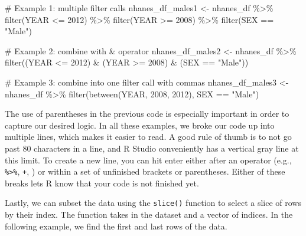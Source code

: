\documentclass[
  letterpaper,
]{latex/krantz}
\makeatletter
\newenvironment{Shaded}{\begin{snugshade}}{\end{snugshade}}
\newcommand{\CommentTok}[1]{\textcolor[rgb]{0.37,0.37,0.37}{#1}}
\newcommand{\DecValTok}[1]{\textcolor[rgb]{0.68,0.00,0.00}{#1}}
\newcommand{\FunctionTok}[1]{\textcolor[rgb]{0.28,0.35,0.67}{#1}}
\newcommand{\NormalTok}[1]{\textcolor[rgb]{0.00,0.23,0.31}{#1}}
\newcommand{\OtherTok}[1]{\textcolor[rgb]{0.00,0.23,0.31}{#1}}
\newcommand{\SpecialCharTok}[1]{\textcolor[rgb]{0.37,0.37,0.37}{#1}}
\newcommand{\StringTok}[1]{\textcolor[rgb]{0.13,0.47,0.30}{#1}}
\newenvironment{kframe}{%
\medskip{}
\setlength{\fboxsep}{.8em}
 \def\at@end@of@kframe{}%
 \ifinner\ifhmode%
  \def\at@end@of@kframe{\end{minipage}}%
  \begin{minipage}{\columnwidth}%
 \fi\fi%
 \def\FrameCommand##1{\hskip\@totalleftmargin \hskip-\fboxsep
 \colorbox{shadecolor}{##1}\hskip-\fboxsep
     \hskip-\linewidth \hskip-\@totalleftmargin \hskip\columnwidth}%
 \MakeFramed {\advance\hsize-\width
   \@totalleftmargin\z@ \linewidth\hsize
   \@setminipage}}%
 {\par\unskip\endMakeFramed%
 \at@end@of@kframe}
\renewenvironment{Shaded}{\begin{kframe}}{\end{kframe}}
\makeatother
\begin{document}
\begin{Shaded}
\begin{Highlighting}[]
\CommentTok{\# Example 1: multiple filter calls}
\NormalTok{nhanes\_df\_males1 }\OtherTok{\textless{}{-}}\NormalTok{ nhanes\_df }\SpecialCharTok{\%\textgreater{}\%}
  \FunctionTok{filter}\NormalTok{(YEAR }\SpecialCharTok{\textless{}=} \DecValTok{2012}\NormalTok{) }\SpecialCharTok{\%\textgreater{}\%}
  \FunctionTok{filter}\NormalTok{(YEAR }\SpecialCharTok{\textgreater{}=} \DecValTok{2008}\NormalTok{) }\SpecialCharTok{\%\textgreater{}\%}
  \FunctionTok{filter}\NormalTok{(SEX }\SpecialCharTok{==} \StringTok{"Male"}\NormalTok{)}

\CommentTok{\# Example 2: combine with \& operator}
\NormalTok{nhanes\_df\_males2 }\OtherTok{\textless{}{-}}\NormalTok{ nhanes\_df }\SpecialCharTok{\%\textgreater{}\%}
  \FunctionTok{filter}\NormalTok{((YEAR }\SpecialCharTok{\textless{}=} \DecValTok{2012}\NormalTok{) }\SpecialCharTok{\&}\NormalTok{ (YEAR }\SpecialCharTok{\textgreater{}=} \DecValTok{2008}\NormalTok{) }\SpecialCharTok{\&}\NormalTok{ (SEX }\SpecialCharTok{==} \StringTok{"Male"}\NormalTok{))}

\CommentTok{\# Example 3: combine into one filter call with commas}
\NormalTok{nhanes\_df\_males3 }\OtherTok{\textless{}{-}}\NormalTok{ nhanes\_df }\SpecialCharTok{\%\textgreater{}\%}
  \FunctionTok{filter}\NormalTok{(}\FunctionTok{between}\NormalTok{(YEAR, }\DecValTok{2008}\NormalTok{, }\DecValTok{2012}\NormalTok{), SEX }\SpecialCharTok{==} \StringTok{"Male"}\NormalTok{)}
\end{Highlighting}
\end{Shaded}

The use of parentheses in the previous code is especially important in
order to capture our desired logic. In all these examples, we broke our
code up into multiple lines, which makes it easier to read. A good rule
of thumb is to not go past 80 characters in a line, and R Studio
conveniently has a vertical gray line at this limit. To create a new
line, you can hit enter either after an operator (e.g.,
\texttt{\%\textgreater{}\%}, \texttt{+}, \texttt{\textbar{}}) or within
a set of unfinished brackets or parentheses. Either of these breaks lets
R know that your code is not finished yet.

Lastly, we can subset the data using the
\texttt{slice()} function to
select a slice of rows by their index. The function takes in the dataset
and a vector of indices. In the following example, we find the first and
last rows of the data.
\end{document}
